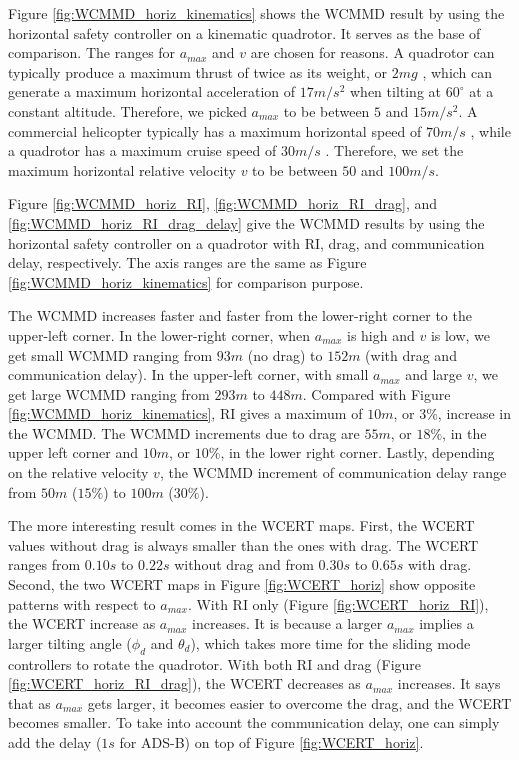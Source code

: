 \documentclass[journal,11pt,onecolumn,draftclsnofoot,]{IEEEtran}
\begin{document}
Figure \ref{fig:WCMMD_horiz_kinematics} shows the WCMMD result by using the horizontal safety controller on a kinematic quadrotor. It serves as the base of comparison. The ranges for $a_{max}$ and $v$ are chosen for reasons. A quadrotor can typically produce a maximum thrust of twice as its weight, or $2mg$ \cite{quad_design}, which can generate a maximum horizontal acceleration of $17m/s^2$ when tilting at $60^{\circ}$ at a constant altitude. Therefore, we picked $a_{max}$ to be between $5$ and $15m/s^2$. A commercial helicopter typically has a maximum horizontal speed of $70m/s$ \cite{helicopter_common_speed}, while a quadrotor has a maximum cruise speed of $30m/s$ \cite{quadrotor_common_speed}. Therefore, we set the maximum horizontal relative velocity $v$ to be between $50$ and $100m/s$.

Figure \ref{fig:WCMMD_horiz_RI}, \ref{fig:WCMMD_horiz_RI_drag}, and \ref{fig:WCMMD_horiz_RI_drag_delay} give the WCMMD results by using the horizontal safety controller on a quadrotor with RI, drag, and communication delay, respectively. The axis ranges are the same as Figure \ref{fig:WCMMD_horiz_kinematics} for comparison purpose.

The WCMMD increases faster and faster from the lower-right corner to the upper-left corner. In the lower-right corner, when $a_{max}$ is high and $v$ is low, we get small WCMMD ranging from $93 m$ (no drag) to $152 m$ (with drag and communication delay). In the upper-left corner, with small $a_{max}$ and large $v$, we get large WCMMD ranging from $293 m$ to $448 m$. Compared with Figure \ref{fig:WCMMD_horiz_kinematics}, RI gives a maximum of $10 m$, or $3\%$, increase in the WCMMD. The WCMMD increments due to drag are $55 m$, or $18\%$, in the upper left corner and $10 m$, or $10\%$, in the lower right corner. Lastly, depending on the relative velocity $v$, the WCMMD increment of communication delay range from $50 m$ ($15\%$) to $100 m$ ($30\%$).

The more interesting result comes in the WCERT maps. First, the WCERT values without drag is always smaller than the ones with drag. The WCERT ranges from $0.10 s$ to $0.22 s$ without drag and from $0.30 s$ to $0.65 s$ with drag. Second, the two WCERT maps in Figure \ref{fig:WCERT_horiz} show opposite patterns with respect to $a_{max}$. With RI only (Figure \ref{fig:WCERT_horiz_RI}), the WCERT increase as $a_{max}$ increases. It is because a larger $a_{max}$ implies a larger tilting angle ($\phi_d$ and $\theta_d$), which takes more time for the sliding mode controllers to rotate the quadrotor. With both RI and drag (Figure \ref{fig:WCERT_horiz_RI_drag}), the WCERT decreases as $a_{max}$ increases. It says that as $a_{max}$ gets larger, it becomes easier to overcome the drag, and the WCERT becomes smaller. To take into account the communication delay, one can simply add the delay ($1s$ for ADS-B) on top of Figure \ref{fig:WCERT_horiz}.
\end{document}
